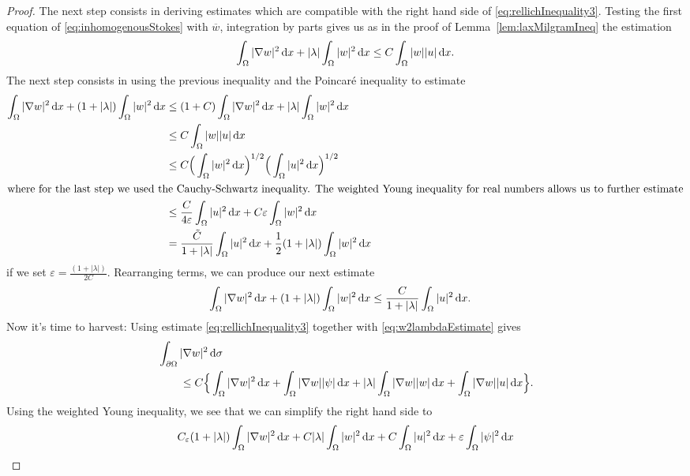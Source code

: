 \begin{proof}
  The next step consists in deriving estimates which are compatible with the right hand side of \eqref{eq:rellichInequality3}.
  Testing the first equation of \eqref{eq:inhomogenousStokes} with $\overline w$, integration by parts gives us as in the proof of Lemma~\ref{lem:laxMilgramIneq} the estimation
  \begin{align*}
    \int_\Omega |\nabla w|^2 \, {\operatorname{d}\!{x}} + |\lambda| \int_\Omega |w|^2 \, {\operatorname{d}\!{x}} \leq C \int_\Omega |w| |u| \, {\operatorname{d}\!{x}}.
  \end{align*}
  The next step consists in using the previous inequality and the Poincar\'{e} inequality to estimate
  \begin{align*}
    \int_\Omega |\nabla w|^2 \d x + (1 + |\lambda| ) \int_\Omega |w|^2 \d x 
    &\leq  (1 + C) \int_\Omega |\nabla w|^2 \d x + |\lambda| \int_\Omega |w|^2 \d x \\
    &\leq C \int_\Omega |w| |u| \d x \\
    &\leq C \Big( \int_\Omega |w|^2 \d x \Big)^{1/2} \Big( \int_\Omega |u|^2 \d x \Big)^{1/2}\\
    \intertext{where for the last step we used the Cauchy-Schwartz inequality. The weighted Young inequality for real numbers allows us to further estimate}
    &\leq \frac{C}{4\varepsilon} \int_\Omega |u|^2 \d x + C \varepsilon \int_\Omega |w|^2 \d x \\
    &= \frac{\tilde C}{1 + |\lambda|} \int_\Omega |u|^2 \d x + \frac{1}{2} ( 1 + |\lambda| ) \int_\Omega |w|^2 \d x
  \end{align*}
  if we set $\varepsilon = \frac{(1 + |\lambda|)}{2 C}$.
  Rearranging terms, we can produce our next estimate
  \begin{align}
    \int_\Omega |\nabla w|^2 \, {\operatorname{d}\!{x}} + ( 1 + |\lambda| ) \int_\Omega |w|^2 \, {\operatorname{d}\!{x}}
    &\leq \frac{C}{1 + |\lambda|} \int_\Omega |u|^2 \, {\operatorname{d}\!{x}}.\label{eq:w2lambdaEstimate}
  \end{align}
  Now it's time to harvest: 
  Using estimate \eqref{eq:rellichInequality3} together with \eqref{eq:w2lambdaEstimate} gives
  \begin{align*}
    &\int_{\partial\Omega} |\nabla w|^2 \, {\operatorname{d}\!{\sigma}} \\
    &\qquad\leq C \Big\{ \int_\Omega |\nabla w|^2 \, {\operatorname{d}\!{x}} + \int_\Omega |\nabla w| |\psi| \, {\operatorname{d}\!{x}} + |\lambda| \int_\Omega |\nabla w| |w| \, {\operatorname{d}\!{x}} + \int_\Omega |\nabla w| |u| \, {\operatorname{d}\!{x}} \Big\}.
  \end{align*}
  Using the weighted Young inequality, we see that we can simplify the right hand side to
  \begin{align*}
    &C_\varepsilon (1 + |\lambda|) \int_{\Omega} |\nabla w|^2 \d x + C |\lambda| \int_\Omega |w|^2 \d x + C \int_\Omega |u|^2 \d x + \varepsilon \int_\Omega |\psi|^2 \d x \\

\end{align*}
\end{proof}
